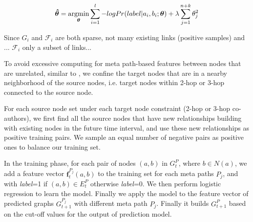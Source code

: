 
\begin{equation}
\boldsymbol{\hat{\theta}} = 
\operatorname*{argmin}\limits_{\boldsymbol{\theta}}\sum_{i=1}^l -log Pr(label |a_i, b_i; \boldsymbol{\theta}) + \lambda \sum_{j=1}^{n+k} \theta_j^2
\end{equation}
 
Since $G_i$ and $\mathcal{F}_i$ are both sparse, not many existing links (positive samples) and ... $\mathcal{F}_i$ only a subset of links...

To avoid excessive computing for meta path-based features between nodes that are unrelated, similar to \cite{sun2011ASONAM}, we confine the target nodes that are in a nearby neighborhood of the source nodes, i.e. target nodes within 2-hop or 3-hop connected to the source node. 

For each source node set under each target node constraint (2-hop or 3-hop co-authors), we first find all the source nodes that have new relationships building with existing nodes in the future time interval, and use these new relationships as positive training pairs. We sample an equal number of negative pairs as positive ones to balance our training set.





In the training phase, for each pair of nodes $(a,b)$ in $G^{P}_{t}$, where $b \in N(a)$, we add a feature vector $\boldsymbol{f}^{P_j}_t(a,b)$ to the training set for each meta paths $P_j$, and with \textit{label}=1 if $(a,b) \in E^{P}_{t}$ otherwise \textit{label}=0. We then perform logistic regression to learn the model. Finally we apply the model to the feature vector of predicted graphs $G^{P_j}_{t+1}$ with different meta path $P_j$. Finally it builds $G^{P}_{t+1}$ based on the cut-off values for the output of prediction model.








